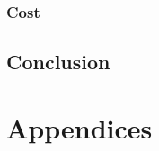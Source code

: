 \documentclass[
	letterpaper, %
	10pt, %
	unnumberedsections, %
	twoside, %
]{APAAssignment}
\begin{document}
\subsection{Cost}


\section{Conclusion}

\clearpage
\printbibliography %





\appendix


\clearpage
\chapter{Appendices}
\begin{appendices}






\end{appendices}
\end{document}
